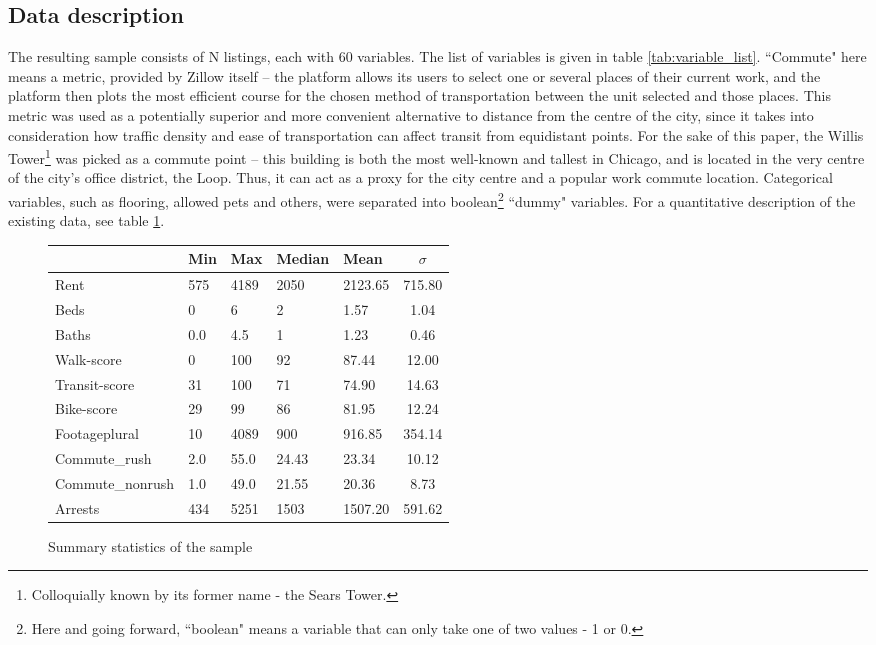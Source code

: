 \documentclass[12pt]{report}
\begin{document}
\subsection{Data description}

The resulting sample consists of N listings, each with 60 variables. The list of variables is given in table \ref{tab:variable_list}. ``Commute" here means a metric, provided by Zillow itself -- the platform allows its users to select one or several places of their current work, and the platform then plots the most efficient course for the chosen method of transportation between the unit selected and those places. This metric was used as a potentially superior and more convenient alternative to distance from the centre of the city, since it takes into consideration how traffic density and ease of transportation can affect transit from equidistant points. For the sake of this paper, the Willis Tower\footnote{Colloquially known by its former name - the Sears Tower.} was picked as a commute point -- this building is both the most well-known and tallest in Chicago, and is located in the very centre of the city's office district, the Loop. Thus, it can act as a proxy for the city centre and a popular work commute location. Categorical variables, such as flooring, allowed pets and others, were separated into boolean\footnote{Here and going forward, ``boolean" means a variable that can only take one of two values - 1 or 0.} ``dummy" variables. For a quantitative description of the existing data, see table \ref{tab:summary_statistics}.

\begin{figure}[ht]
	\centering
	\begin{tabular}{l l l l l S[table-format=3.2]}
		\hline
		                 & Min & Max  & Median & Mean    & $\sigma$ \\
		\hline
		Rent             & 575 & 4189 & 2050   & 2123.65 & 715.80   \\
		Beds             & 0   & 6    & 2      & 1.57    & 1.04     \\
		Baths            & 0.0 & 4.5  & 1      & 1.23    & 0.46     \\
		Walk-score       & 0   & 100  & 92     & 87.44   & 12.00    \\
		Transit-score    & 31  & 100  & 71     & 74.90   & 14.63    \\
		Bike-score       & 29  & 99   & 86     & 81.95   & 12.24    \\
		Footageplural    & 10  & 4089 & 900    & 916.85  & 354.14   \\
		Commute\_rush    & 2.0 & 55.0 & 24.43  & 23.34   & 10.12    \\
		Commute\_nonrush & 1.0 & 49.0 & 21.55  & 20.36   & 8.73     \\
		Arrests          & 434 & 5251 & 1503   & 1507.20 & 591.62   \\
		\hline
	\end{tabular}
	\caption{Summary statistics of the sample}
	\label{tab:summary_statistics}
\end{figure}
\end{document}
